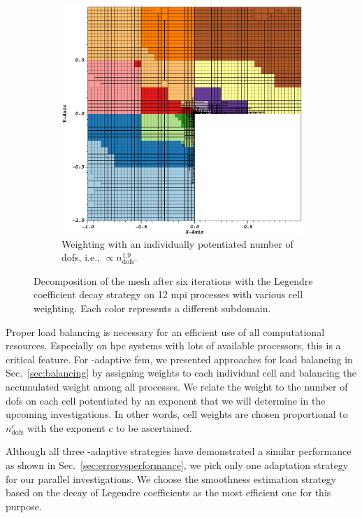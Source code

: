 \begin{figure}
\begin{subfigure}[t]{.49\textwidth}
  \includegraphics[width=\textwidth]{figures/results/corner-2d-error-hp-legendre-05_subdomain12_customweighting.png}
  \caption{Weighting with an individually potentiated number of \glspl{dof}, i.e., $\propto n_\text{dofs}^{1.9}$.}
\end{subfigure}
\caption{Decomposition of the mesh after six iterations with the Legendre coefficient decay strategy on 12 \gls{mpi} processes with various cell weighting. Each color represents a different subdomain.}
\label{fig:decomposition}
\end{figure}

Proper load balancing is necessary for an efficient use of all computational resources. Especially on \gls{hpc} systems with lots of available processors, this is a critical feature. For \hp-adaptive \gls{fem}, we presented approaches for load balancing in Sec.~\ref{sec:balancing} by assigning weights to each individual cell and balancing the accumulated weight among all processes. We relate the weight to the number of \glspl{dof} on each cell potentiated by an exponent that we will determine in the upcoming investigations. In other words, cell weights are chosen proportional to $n_\text{dofs}^c$ with the exponent $c$ to be ascertained.

Although all three \hp-adaptive strategies have demonstrated a similar performance as shown in Sec.~\ref{sec:errorvsperformance}, we pick only one adaptation strategy for our parallel investigations. We choose the smoothness estimation strategy based on the decay of Legendre coefficients as the most efficient one for this purpose.

